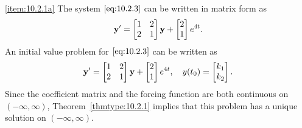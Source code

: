 \documentclass{ximera}
\begin{document}
\begin{example}
\begin{explanation}
\ref{item:10.2.1a}
The system  $\eqref{eq:10.2.3}$ can be written in matrix form as
$$
{\bf y}'=\begin{bmatrix}1&2\\2&1\end{bmatrix}{\bf y}+\begin{bmatrix}2\\1\end{bmatrix}e^{4t}.
$$
An initial value problem for $\eqref{eq:10.2.3}$ can be written as
$$
{\bf y}'=\begin{bmatrix}1&2\\2&1\end{bmatrix}{\bf y}+\begin{bmatrix}2\\1\end{bmatrix}e^{4t}, \quad
y(t_0)=\begin{bmatrix}k_1\\k_2\end{bmatrix}.
$$
Since the coefficient matrix and the forcing function are both
continuous on $(-\infty,\infty)$, Theorem~\ref{thmtype:10.2.1} implies that
this problem has a unique solution on $(-\infty,\infty)$.


\end{explanation}
\end{example}
\end{document}

